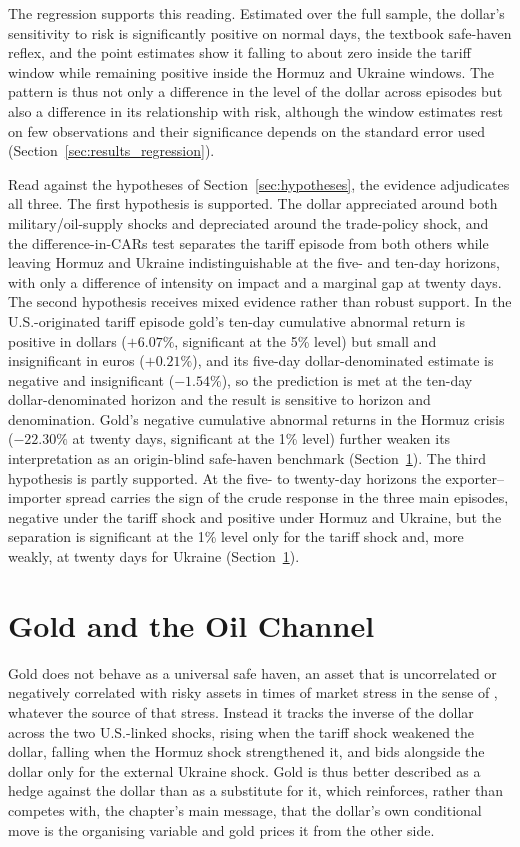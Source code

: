 The regression supports this reading. Estimated over the full sample, the dollar's sensitivity to risk is significantly positive on normal days, the textbook safe-haven reflex, and the point estimates show it falling to about zero inside the tariff window while remaining positive inside the Hormuz and Ukraine windows. The pattern is thus not only a difference in the level of the dollar across episodes but also a difference in its relationship with risk, although the window estimates rest on few observations and their significance depends on the standard error used (Section~\ref{sec:results_regression}).

Read against the hypotheses of Section~\ref{sec:hypotheses}, the evidence adjudicates
all three. The first hypothesis is supported. The dollar appreciated around both military/oil-supply
shocks and depreciated around the trade-policy shock, and the difference-in-CARs test separates
the tariff episode from both others while leaving Hormuz and Ukraine indistinguishable at the five- and ten-day horizons, with only
a difference of intensity on impact and a marginal gap at twenty days.
The second hypothesis receives mixed evidence rather than robust support. In the U.S.-originated tariff episode gold's ten-day cumulative abnormal return is positive in dollars ($+6.07\%$, significant at the 5\% level) but small and insignificant in euros ($+0.21\%$), and its five-day dollar-denominated estimate is negative and insignificant ($-1.54\%$), so the prediction is met at the ten-day dollar-denominated horizon and the result is sensitive to horizon and denomination. Gold's negative cumulative abnormal returns in the Hormuz crisis ($-22.30\%$ at twenty days, significant at the 1\% level) further weaken its interpretation as an origin-blind safe-haven benchmark (Section~\ref{sec:disc_oil}).
The third hypothesis is partly supported. At the five- to twenty-day horizons the exporter--importer spread carries the sign of the crude response in the three main episodes, negative under the tariff shock and positive under Hormuz and Ukraine, but the separation is significant at the 1\% level only for the tariff shock and, more weakly, at twenty days for Ukraine (Section~\ref{sec:disc_oil}).

\section{Gold and the Oil Channel}
\label{sec:disc_oil}

Gold does not behave as a universal safe haven, an asset that is uncorrelated or negatively correlated with risky assets in times of market stress in the sense of \textcite{baur_lucey_2010}, whatever the source of that stress. Instead it tracks the inverse of the dollar across the
two U.S.-linked shocks, rising when the tariff shock weakened the dollar, falling when the
Hormuz shock strengthened it, and bids alongside the dollar only for the external Ukraine
shock. Gold is thus better described as a hedge against the dollar than as a
substitute for it, which reinforces, rather than competes with, the chapter's main message,
that the dollar's own conditional move is the organising variable and gold prices it from the
other side.

